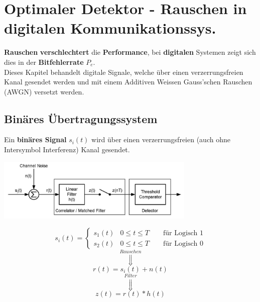 \section{Optimaler Detektor - Rauschen in digitalen Kommunikationssys. }
\textbf{Rauschen} \textbf{verschlechtert} die \textbf{Performance}, bei \textbf{digitalen} Systemen zeigt sich dies in der
\textbf{Bitfehlerrate} $P_e$. \\
Dieses Kapitel behandelt digitale Signale, welche über einen verzerrungsfreien Kanal gesendet werden
und mit einem Additiven Weissen Gauss'schen Rauschen (AWGN) versetzt werden. 

\subsection{Binäres Übertragungssystem }
Ein \textbf{binäres Signal} $s_i(t)$  wird
über einen verzerrungsfreien (auch ohne Intersymbol Interferenz) Kanal gesendet. \\
\begin{minipage}{10cm}
 	\includegraphics[width=9.5cm]{bilder/09_digital_signal_detection.png}
\end{minipage}
\begin{minipage}[c]{9cm}
	$$s_i(t) = \begin{cases}
          	s_1(t) & 0 \leq t \leq T \qquad \text{für Logisch } 1 \\
          	s_2(t) & 0 \leq t \leq T \qquad \text{für Logisch } 0          	
          \end{cases} $$
	$$\overset{Rauschen}{\Downarrow}$$
	$$	r(t) = s_i(t) + n(t) $$
	$$	\overset{Filter}{\Downarrow} $$ 
	$$	z(t) = r(t) \ast h(t) $$
\end{minipage}

